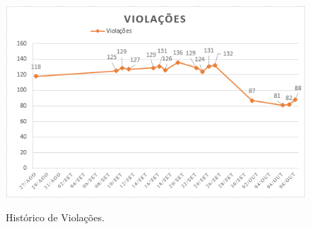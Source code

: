 \begin{figure}[H]
\centering 
\caption[Histórico de Violações]{Histórico de Violações.}\includegraphics[scale=0.9]{./images/histviolacoes}
\label{fig:histissues}
\end{figure}	